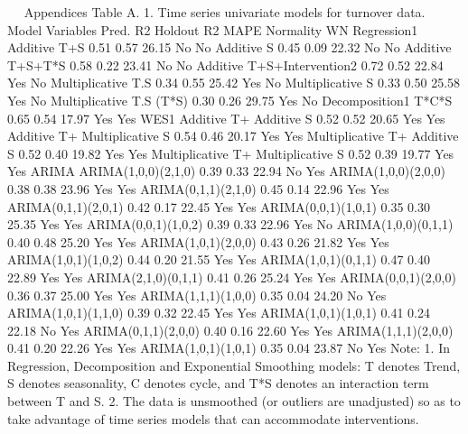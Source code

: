  
Appendices
Table A. 1. Time series univariate models for turnover data.
Model	Variables	Pred. R2	Holdout R2	MAPE	Normality	WN
Regression1	Additive T+S	0.51	0.57	26.15	No	No
	Additive S	0.45	0.09	22.32	No	No
	Additive T+S+T*S	0.58	0.22	23.41	No	No
	Additive T+S+Intervention2	0.72	0.52	22.84	Yes	No
	Multiplicative T.S	0.34	0.55	25.42	Yes	No
	Multiplicative S	0.33	0.50	25.58	Yes	No
	Multiplicative T.S (T*S)	0.30	0.26	29.75	Yes	No
Decomposition1	T*C*S	0.65	0.54	17.97	Yes	Yes
WES1	Additive T+ Additive S	0.52	0.52	20.65	Yes	Yes
	Additive T+ Multiplicative S	0.54	0.46	20.17	Yes	Yes
	Multiplicative T+ Additive S	0.52	0.40	19.82	Yes	Yes
	Multiplicative T+ Multiplicative S	0.52	0.39	19.77	Yes	Yes
ARIMA	ARIMA(1,0,0)(2,1,0)	0.39	0.33	22.94	No	Yes
	ARIMA(1,0,0)(2,0,0)	0.38	0.38	23.96	Yes	Yes
	ARIMA(0,1,1)(2,1,0)	0.45	0.14	22.96	Yes	Yes
	ARIMA(0,1,1)(2,0,1)	0.42	0.17	22.45	Yes	Yes
	ARIMA(0,0,1)(1,0,1)	0.35	0.30	25.35	Yes	Yes
	ARIMA(0,0,1)(1,0,2)	0.39	0.33	22.96	Yes	No
	ARIMA(1,0,0)(0,1,1)	0.40	0.48	25.20	Yes	Yes
	ARIMA(1,0,1)(2,0,0)	0.43	0.26	21.82	Yes	Yes
	ARIMA(1,0,1)(1,0,2)	0.44	0.20	21.55	Yes	Yes
	ARIMA(1,0,1)(0,1,1)	0.47	0.40	22.89	Yes	Yes
	ARIMA(2,1,0)(0,1,1)	0.41	0.26	25.24	Yes	Yes
	ARIMA(0,0,1)(2,0,0)	0.36	0.37	25.00	Yes	Yes
	ARIMA(1,1,1)(1,0,0)	0.35	0.04	24.20	No	Yes
	ARIMA(1,0,1)(1,1,0)	0.39	0.32	22.45	Yes	Yes
	ARIMA(1,0,1)(1,0,1)	0.41	0.24	22.18	No	Yes
	ARIMA(0,1,1)(2,0,0)	0.40	0.16	22.60	Yes	Yes
	ARIMA(1,1,1)(2,0,0)	0.41	0.20	22.26	Yes	Yes
	ARIMA(1,0,1)(1,0,1)	0.35	0.04	23.87	No	Yes
Note: 1. In Regression, Decomposition and Exponential Smoothing models: T denotes Trend, S denotes seasonality, C denotes cycle, and T*S denotes an interaction term between T and S. 
          2. The data is unsmoothed (or outliers are unadjusted) so as to take advantage of time series models that can accommodate interventions.

